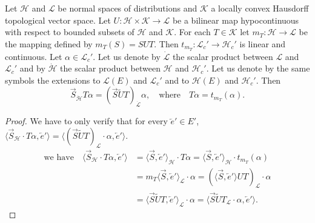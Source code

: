 \setcounter{section}{7}
\setcounter{prop}{1}
\begin{prop}\label{chap7:prop7.2}
Let $\mathscr{H}$ and $\mathscr{L}$ be normal spaces of distributions
and $\mathscr{K}$ a locally convex Hausdorff topological vector
space. Let $U: \mathscr{H}\times\mathscr{K} \to \mathscr{L}$ be a
bilinear map hypocontinuous with respect to bounded subsets of
$\mathscr{H}$ and $\mathscr{K}$. For each $T \in \mathscr{K}$ let $m_T
: \mathscr{H} \to \mathscr{L}$ be the mapping defined by $m_T (S) = S
U T$. Then $t_{m_T} : \mathscr{L}_c' \to \mathscr{H}_c'$ is linear and
continuous. Let $\alpha \in \mathscr{L}_c'$. Let us denote by
$\dot{\mathscr{L}}$ the scalar product between $\mathscr{L}$ and
$\mathscr{L}_c'$ and by $\dot{\mathscr{H}}$ the scalar product between
$\mathscr{H}$ and $\mathscr{H}_c'$. Let us denote by the same symbols
the extensions to $\mathscr{L} (E)$ and $\mathscr{L}_c'$ and to
$\mathscr{H} (E)$ and $\mathscr{H}_c'$. Then 
$$
\overrightarrow{S}_{\dot{\mathscr{H}}} T\alpha = (\overrightarrow{S}
\tilde{U} T)_{\dot{\mathscr{L}}}\alpha , \quad \text {where}\quad T\alpha =
t_{m_T}(\alpha).  
$$ 
\end{prop}
\begin{proof}
We have to only verify that for every $\overleftarrow{e}' \in E'$,
$\langle \overrightarrow{S}_{\mathscr{H}} \cdot T \alpha,
\overleftarrow{e}'\rangle = \langle (\overrightarrow{S} \tilde{U}
T)_{\mathscr{L}} \cdot\alpha , \overleftarrow{e}'\rangle$.
\begin{align*}
\text{we have} \quad \langle \overrightarrow{S}_{\mathscr{H}} \cdot T \alpha,
\overleftarrow{e}'\rangle &= \langle \overrightarrow{S},
\overleftarrow{e}'\rangle_{\mathscr{H}} \cdot T\alpha = \langle
\overrightarrow{S}, \overleftarrow{e}'\rangle_{\mathscr{H}} \cdot t_{m_T}
(\alpha)\\
&= m_T \langle \overrightarrow{S},
\overleftarrow{e}'\rangle_{\mathscr{L}} \cdot\alpha = (\langle
\overrightarrow{S}, \overleftarrow{e}'\rangle
UT)_{\mathscr{L}} \cdot \alpha\\
&= \langle \overrightarrow{S} \tilde{U} T,
\overleftarrow{e}'\rangle_{\mathscr{L}} \cdot \alpha = \langle
\overrightarrow{S} \tilde{U} T_{\mathscr{L}} 
\cdot \alpha, \overleftarrow{e}'\rangle.
\end{align*}
\end{proof}

